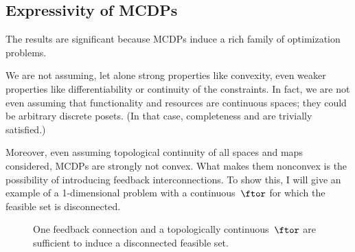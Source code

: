 \subsection{Expressivity of MCDPs}

The results are significant because MCDPs induce a rich family of
optimization problems.

We are not assuming, let alone strong properties like convexity, even
weaker properties like differentiability or continuity of the constraints.
In fact, we are not even assuming that functionality and resources
are continuous spaces; they could be arbitrary discrete posets. (In
that case, completeness and \scottcontinuity are trivially satisfied.)

Moreover, even assuming topological continuity of all spaces and maps
considered, MCDPs are strongly not convex. What makes them nonconvex
is the possibility of introducing feedback interconnections. To show
this, I will give an example of a 1-dimensional problem with a continuous~$\ftor$
for which the feasible set is disconnected.

\begin{figure}[h]
    \hfill
    \hfill
    \hfill
    \caption{One feedback connection and a topologically continuous~$\ftor$
        are sufficient to induce a disconnected feasible set.}
    \label{fig:ceil-1}
\end{figure}

\medskip{}

